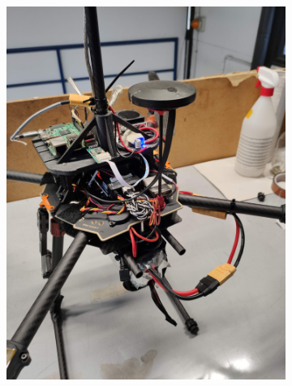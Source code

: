 \begin{figure}[!ht]
\begin{subfigure}[b]{0.32\textwidth}
        \includegraphics[width=\textwidth, angle=-90]{images/drone/IMG_20211105_103729.jpg}
        \caption{}
        \label{fig:auto}
    \end{subfigure}
    \begin{subfigure}[b]{0.32\textwidth}
        \centering

\end{subfigure}
\end{figure}
